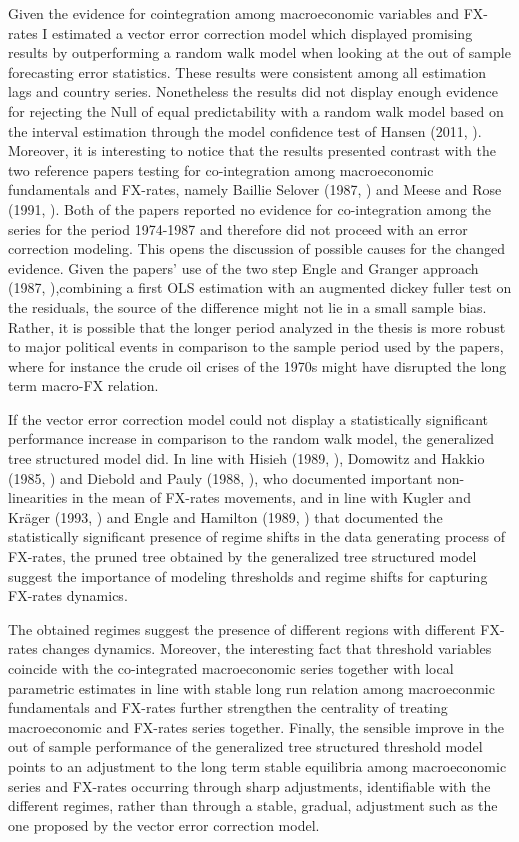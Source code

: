 Given the evidence for cointegration among macroeconomic variables and
FX-rates I estimated a vector error correction model which displayed
promising results by outperforming a random walk model when looking at
the out of sample forecasting error statistics. These results were
consistent among all estimation lags and country series. Nonetheless
the results did not display enough evidence for rejecting the Null of
equal predictability with a random walk model based on the interval
estimation through the model confidence test of Hansen (2011,
\cite{HansenMCS}). Moreover, it is interesting to notice that the
results presented contrast with the two reference papers testing for
co-integration among macroeconomic fundamentals and FX-rates, namely
Baillie Selover (1987, \cite{BaillieSelover}) and Meese and Rose
(1991, \cite{MeeseRose}). Both of the papers reported no evidence for
co-integration among the series for the period 1974-1987 and therefore
did not proceed with an error correction modeling. This opens the
discussion of possible causes for the changed evidence. Given the
papers' use of the two step Engle and Granger approach (1987,
\cite{EngleGranger}),combining a first OLS estimation with an
augmented dickey fuller test on the residuals, the source of the
difference might not lie in a small sample bias. Rather, it is
possible that the longer period analyzed in the thesis is more robust
to major political events in comparison to the sample period used by
the papers, where for instance the crude oil crises of the 1970s might
have disrupted the long term macro-FX relation.

If the vector error correction model could not display a
statistically significant performance increase in comparison to the
random walk model, the generalized tree structured model did. In line
with Hisieh (1989, \cite{Hisieh}), Domowitz and Hakkio (1985,
\cite{DomowitzHakkio}) and Diebold and Pauly (1988,
\cite{DieboldPauly}), who documented important non-linearities in the
mean of FX-rates movements, and in line with Kugler and Kr{\"a}ger
(1993, \cite{KuglerKrager}) and Engle and Hamilton (1989,
\cite{EngleHamilton}) that documented the statistically significant
presence of regime shifts in the data generating process of FX-rates,
the pruned tree obtained by the generalized tree structured model
suggest the importance of modeling thresholds and regime shifts for
capturing FX-rates dynamics.

The obtained regimes suggest the presence of different regions with
different FX-rates changes dynamics.  Moreover, the interesting fact
that threshold variables coincide with the co-integrated macroeconomic
series together with local parametric estimates in line with stable
long run relation among macroeconmic fundamentals and FX-rates further
strengthen the centrality of treating macroeconomic and FX-rates
series together.  Finally, the sensible improve in the out of sample
performance of the generalized tree structured threshold model points
to an adjustment to the long term stable equilibria among
macroeconomic series and FX-rates occurring through sharp adjustments,
identifiable with the different regimes, rather than through a stable,
gradual, adjustment such as the one proposed by the vector error
correction model.

